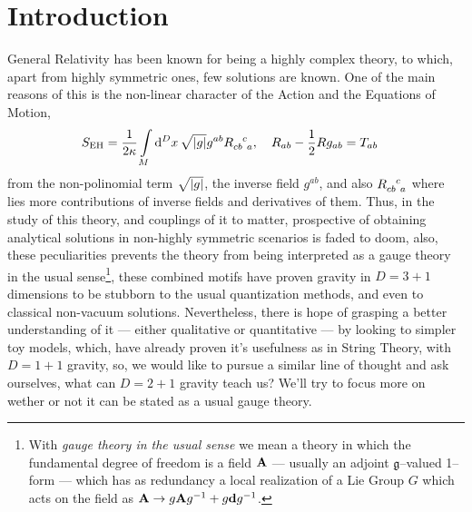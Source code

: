 \section{Introduction}

General Relativity has been known for being a highly complex theory, to which, apart from highly symmetric ones, few solutions are known. One of 
the main reasons of this is the non-linear character of the Action and the Equations of Motion,
\begin{align*}
    S_{\textnormal{EH}}&=\frac{1}{2\kappa}\int\limits_M\dd[D]{x}\sqrt{\abs{g}}g^{ab}\tensor{R}{_c_b^c_a},\ \ \ R_{ab}-\frac12Rg_{ab}=T_{ab}
\end{align*}
from the non-polinomial term $\sqrt{\abs{g}}$, the inverse field $g^{ab}$, and also $\tensor{R}{_c_b^c_a}$ where lies more 
contributions of inverse fields and derivatives of them. Thus, in the study of this theory, and couplings of it to matter, prospective of obtaining 
analytical solutions in non-highly symmetric scenarios is faded to doom, also, these peculiarities prevents the theory from being interpreted as a 
gauge theory in the usual sense\footnote{With \textit{gauge theory in the usual sense} we mean a theory in which the fundamental degree of freedom is a 
field $\vb A$ --- usually an adjoint $\mathfrak g$--valued 1--form --- which has as redundancy a local realization of a Lie Group $G$ which acts on the field as $\vb A\rightarrow g\vb Ag^{-1}+g\vb dg^{-1}$.}, 
these combined motifs have proven gravity in $D=3+1$ dimensions to be stubborn to the usual quantization methods, and even to classical non-vacuum solutions. 
Nevertheless, there is hope of grasping a better understanding of it --- either qualitative or quantitative --- by looking to simpler toy models, which, 
have already proven it's usefulness as in String Theory, with $D=1+1$ gravity, so, we would like to pursue a similar line of thought and 
ask ourselves, what can $D=2+1$ gravity teach us? We'll try to focus more on wether or not it can be stated as a usual gauge theory.

